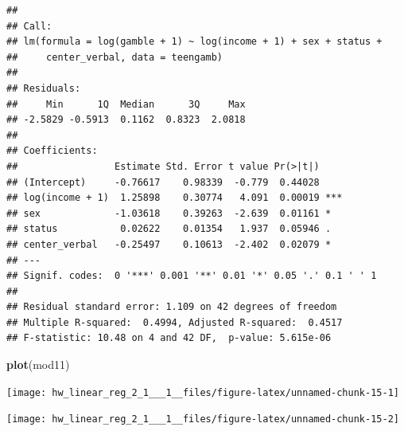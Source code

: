 \documentclass[]{article}
\newenvironment{Shaded}{\begin{snugshade}}{\end{snugshade}}
\newcommand{\KeywordTok}[1]{\textcolor[rgb]{0.13,0.29,0.53}{\textbf{#1}}}
\newcommand{\DataTypeTok}[1]{\textcolor[rgb]{0.13,0.29,0.53}{#1}}
\newcommand{\DecValTok}[1]{\textcolor[rgb]{0.00,0.00,0.81}{#1}}
\newcommand{\OperatorTok}[1]{\textcolor[rgb]{0.81,0.36,0.00}{\textbf{#1}}}
\newcommand{\NormalTok}[1]{#1}
\begin{document}
\begin{Shaded}
\end{Shaded}

\begin{verbatim}
## 
## Call:
## lm(formula = log(gamble + 1) ~ log(income + 1) + sex + status + 
##     center_verbal, data = teengamb)
## 
## Residuals:
##     Min      1Q  Median      3Q     Max 
## -2.5829 -0.5913  0.1162  0.8323  2.0818 
## 
## Coefficients:
##                 Estimate Std. Error t value Pr(>|t|)    
## (Intercept)     -0.76617    0.98339  -0.779  0.44028    
## log(income + 1)  1.25898    0.30774   4.091  0.00019 ***
## sex             -1.03618    0.39263  -2.639  0.01161 *  
## status           0.02622    0.01354   1.937  0.05946 .  
## center_verbal   -0.25497    0.10613  -2.402  0.02079 *  
## ---
## Signif. codes:  0 '***' 0.001 '**' 0.01 '*' 0.05 '.' 0.1 ' ' 1
## 
## Residual standard error: 1.109 on 42 degrees of freedom
## Multiple R-squared:  0.4994, Adjusted R-squared:  0.4517 
## F-statistic: 10.48 on 4 and 42 DF,  p-value: 5.615e-06
\end{verbatim}

\begin{Shaded}
\begin{Highlighting}[]
\KeywordTok{plot}\NormalTok{(mod11)}
\end{Highlighting}
\end{Shaded}

\begin{center}\texttt{[image: hw\_linear\_reg\_2\_1\_\_\_1\_\_files/figure-latex/unnamed-chunk-15-1]} \end{center}

\begin{center}\texttt{[image: hw\_linear\_reg\_2\_1\_\_\_1\_\_files/figure-latex/unnamed-chunk-15-2]} \end{center}
\end{document}

